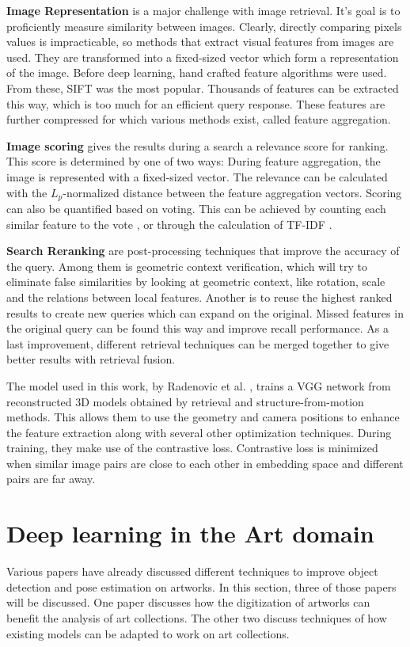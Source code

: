 \textbf{Image Representation} is a major challenge with image retrieval.
It's goal is to proficiently measure similarity between images.
Clearly, directly comparing pixels values is impracticable, so methods that extract visual features from images are used.
They are transformed into a fixed-sized vector which form a representation of the image.
Before deep learning, hand crafted feature algorithms were used.
From these, \gls{SIFT} \cite{Lowe1999} was the most popular.
Thousands of features can be extracted this way, which is too much for an efficient query response.
These features are further compressed for which various methods exist, called feature aggregation.

\textbf{Image scoring} gives the results during a search a relevance score for ranking.
This score is determined by one of two ways:
During feature aggregation, the image is represented with a fixed-sized vector.
The relevance can be calculated with the $L_p$-normalized distance between the feature aggregation vectors.
Scoring can also be quantified based on voting.
This can be achieved by counting each similar feature to the vote \cite{Zhou2011}, or through the calculation of \gls{TF-IDF} \cite{Zhang2011}.

\textbf{Search Reranking} are post-processing techniques that improve the accuracy of the query.
Among them is geometric context verification, which will try to eliminate false similarities by looking at geometric context, like rotation, scale and the relations between local features.
Another is to reuse the highest ranked results to create new queries which can expand on the original.
Missed features in the original query can be found this way and improve recall performance.
As a last improvement, different retrieval techniques can be merged together to give better results with retrieval fusion.

The model used in this work, by Radenovic et al. \cite{Radenovic2017}, trains a VGG network from reconstructed 3D models obtained by retrieval and structure-from-motion methods.
This allows them to use the geometry and camera positions to enhance the feature extraction along with several other optimization techniques.
During training, they make use of the contrastive loss.
Contrastive loss is minimized when similar image pairs are close to each other in embedding space and different pairs are far away.

\section{Deep learning in the Art domain}
\label{sec:related_papers}
Various papers have already discussed different techniques to improve object detection and pose estimation on artworks.
In this section, three of those papers will be discussed.
One paper discusses how the digitization of artworks can benefit the analysis of art collections.
The other two discuss techniques of how existing models can be adapted to work on art collections.
\\

